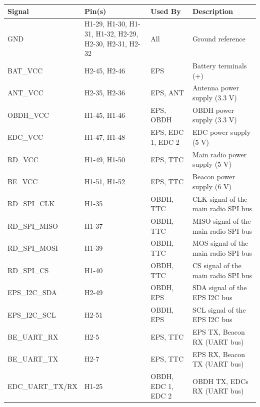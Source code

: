 \begin{table}[!h]
    \centering
    \begin{tabular}{lL{0.2\textwidth}L{0.15\textwidth}L{0.33\textwidth}}
        \toprule[1.5pt]
        \textbf{Signal}  & \textbf{Pin(s)} & \textbf{Used By}     & \textbf{Description} \\
        \midrule
        GND              & H1-29, H1-30, H1-31, H1-32, H2-29, H2-30, H2-31, H2-32 & All                  & Ground reference \\
        BAT\_VCC         & H2-45, H2-46    & EPS                  & Battery terminals (+) \\
        ANT\_VCC         & H2-35, H2-36    & EPS, ANT             & Antenna power supply (3.3 V) \\
        OBDH\_VCC        & H1-45, H1-46    & EPS, OBDH            & OBDH power supply (3.3 V) \\
        EDC\_VCC         & H1-47, H1-48    & EPS, EDC 1, EDC 2    & EDC power supply (5 V) \\
        RD\_VCC          & H1-49, H1-50    & EPS, TTC             & Main radio power supply (5 V) \\
        BE\_VCC          & H1-51, H1-52    & EPS, TTC             & Beacon power supply (6 V) \\
        RD\_SPI\_CLK     & H1-35           & OBDH, TTC            & CLK signal of the main radio SPI bus \\
        RD\_SPI\_MISO    & H1-37           & OBDH, TTC            & MISO signal of the main radio SPI bus \\
        RD\_SPI\_MOSI    & H1-39           & OBDH, TTC            & MOS signal of the main radio SPI bus \\
        RD\_SPI\_CS      & H1-40           & OBDH, TTC            & CS signal of the main radio SPI bus \\
        EPS\_I2C\_SDA    & H2-49           & OBDH, EPS            & SDA signal of the EPS I2C bus \\
        EPS\_I2C\_SCL    & H2-51           & OBDH, EPS            & SCL signal of the EPS I2C bus \\
        BE\_UART\_RX     & H2-5            & EPS, TTC             & EPS TX, Beacon RX (UART bus) \\
        BE\_UART\_TX     & H2-7            & EPS, TTC             & EPS RX, Beacon TX (UART bus) \\
        EDC\_UART\_TX/RX & H1-25           & OBDH, EDC 1, EDC 2   & OBDH TX, EDCs RX (UART bus) \\

\end{tabular}
\end{table}
